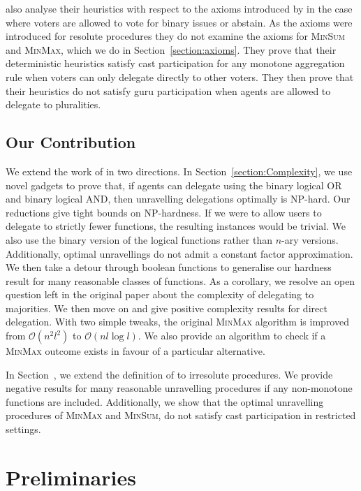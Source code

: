 \documentclass[11pt,a4paper, titlepage]{article}
\theoremstyle{definition}
\begin{document}
\citeauthor{grandi} also analyse their heuristics with respect to the axioms introduced by \citeauthor{kotsialou} in the case where voters are allowed to vote for binary issues or abstain. 
As the axioms were introduced for resolute procedures they do not examine the axioms for \textsc{MinSum} and \textsc{MinMax}, which we do in Section~\ref{section:axioms}.
They prove that their deterministic heuristics satisfy cast participation for any monotone aggregation rule when voters can only delegate directly to other voters.
They then prove that their heuristics do not satisfy guru participation when agents are allowed to delegate to pluralities.

\subsection{Our Contribution}

We extend the work of \citeauthor{grandi} in two directions. 
In Section~\ref{section:Complexity}, we use novel gadgets to prove that, if agents can delegate using the binary logical OR and binary logical AND, then unravelling delegations optimally is NP-hard.
Our reductions give tight bounds on NP-hardness.
If we were to allow users to delegate to strictly fewer functions, the resulting instances would be trivial.
We also use the binary version of the logical functions rather than $n$-ary versions.
Additionally, optimal unravellings do not admit a constant factor approximation.
We then take a detour through boolean functions to generalise our hardness result for many reasonable classes of functions. 
As a corollary, we resolve an open question left in the original paper about the complexity of delegating to majorities.
We then move on and give positive complexity results for direct delegation.
With two simple tweaks, the original \textsc{MinMax} algorithm is improved from $\mathcal{O}(n^2l^2)$ to $\mathcal{O}(nl \log l)$.
We also provide an algorithm to check if a \textsc{MinMax} outcome exists in favour of a particular alternative.

In Section~, we extend the definition of \citet{kotsialou} to irresolute procedures.
We provide negative results for many reasonable unravelling procedures if any non-monotone functions are included.
Additionally, we show that the optimal unravelling procedures of \textsc{MinMax} and \textsc{MinSum}, do not satisfy cast participation in restricted settings.


\newpage

\section{Preliminaries}
\end{document}

